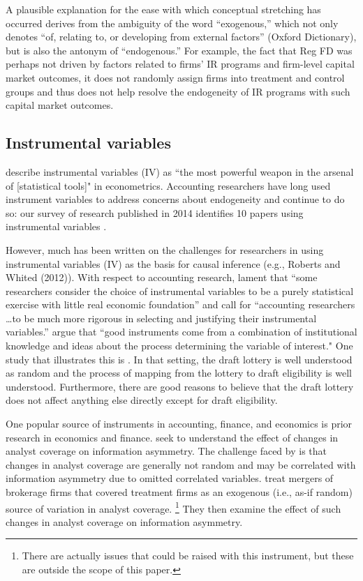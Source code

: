 A plausible explanation for the ease with which conceptual stretching has occurred derives from the ambiguity of the word ``exogenous,'' which not only denotes  ``of, relating to, or developing from external factors'' (Oxford Dictionary), but is also the antonym of ``endogenous.''
For example, the fact that Reg FD was perhaps not driven by factors related to firms' IR programs and firm-level capital market outcomes, it does not randomly assign firms into treatment and control groups and thus does not help resolve the endogeneity of IR programs with such capital market outcomes.

\subsection{Instrumental variables}
\citet[p.114]{Angrist:2008vk} describe instrumental variables (IV) as ``the most powerful weapon in the arsenal of [statistical tools]" in econometrics. 
Accounting researchers have long used instrument variables to address concerns about endogeneity \citep{Larcker:2010fq} and continue to do so: our survey of research published in 2014 identifies 10 papers using instrumental variables \citep{Cannon:2014im,Cohen:2014jl,Kim:2014fm,Vermeer:2014bs,Fox:2014io,Guedhami:2013cj,Houston:2014hv,deFranco:2014ct,Erkens:2014hj,Correia:2014fp}. 

However, much has been written on the challenges for researchers in using instrumental variables (IV) as the basis for causal inference (e.g., Roberts and Whited (2012)). 
With respect to accounting research, \citet{Larcker:2010fq} lament that ``some researchers consider the choice of instrumental variables to be a purely statistical exercise with little real economic foundation'' and call for 
``accounting researchers \dots to be much more rigorous in selecting and justifying their instrumental variables.'' 
\citet[p.117]{Angrist:2008vk} argue that ``good instruments come from a combination of institutional knowledge and ideas about the process determining the variable of interest."
One study that illustrates this is \cite{Angrist:2008vk}.
In that setting, the draft lottery is well understood as random and the process of mapping from the lottery to draft eligibility is well understood.
Furthermore, there are good reasons to believe that the draft lottery does not affect anything else directly except for draft eligibility.

One popular source of instruments in accounting, finance, and economics is prior research in economics and finance.
\citet{Kelly:2012ih} seek to understand the effect of changes in analyst coverage on information asymmetry. 
The challenge faced by \citet{Kelly:2012ih} is that changes in analyst coverage are generally not random and may be correlated with information asymmetry due to omitted correlated variables.
\citet{Kelly:2012ih} treat mergers of brokerage firms that covered treatment firms as an exogenous (i.e., as-if random) source of variation in analyst coverage. \footnote{There are actually issues that could be raised with this instrument, but these are outside the scope of this paper.} They then examine the effect of such changes in analyst coverage on information asymmetry.

